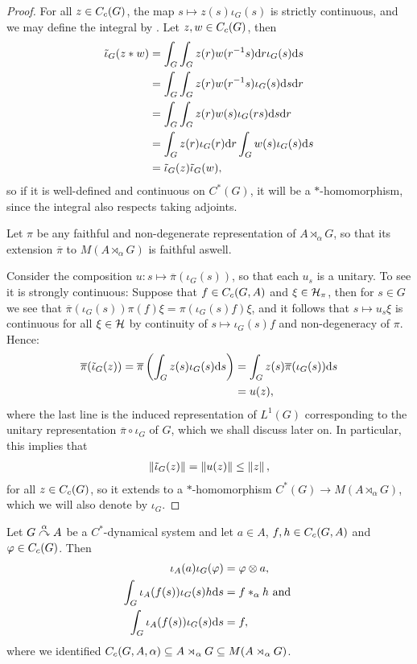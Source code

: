 \begin{proof}
For all $z \in C_c(G)$, the map $s \mapsto z(s) \iota_G(s)$ is strictly continuous, and we may define the integral by . Let $z,w \in C_c(G)$, then
\begin{align*}
	\tilde \iota_G(z \ast w) &= \int_G \int_G z(r)w(r^{-1}s) \mathrm{d} r \iota_G(s) \mathrm{d} s \\
	&= \int_G \int_G z(r) w(r^{-1}s) \iota_G(s) \mathrm{d} s \mathrm{d} r\\
	&= \int_G \int_G z(r) w(s) \iota_G(rs) \mathrm{d} s \mathrm{d} r\\
	&= \int_G z(r) \iota_G(r) \mathrm{d} r \int_G w(s) \iota_G(s) \mathrm{d} s \\
	&= \tilde \iota_G(z) \tilde \iota_G(w),
\end{align*}
so if it is well-defined and continuous on $C^*(G)$, it will be a $*$-homomorphism, since the integral also respects taking adjoints. 

Let $\pi$ be any faithful and non-degenerate representation of $A \rtimes_\alpha G$, so that its extension $\overline \pi $ to $M(A \rtimes_ \alpha G)$ is faithful aswell.

Consider the composition $u \colon s \mapsto \overline{\pi}( \iota_G(s))$, so that each $u_s$ is a unitary. To see it is strongly continuous: Suppose that $f \in C_c(G,A)$ and $\xi \in \mathcal{H}_\pi$, then for $s \in G$ we see that $\overline{ \pi} (\iota_G(s)) \pi(f) \xi = \pi(\iota_G(s) f) \xi$, and it follows that  $s \mapsto u_s \xi$ is continuous for all $\xi \in \mathcal{H}$ by continuity of $s \mapsto \iota_G(s)f$ and non-degeneracy of $\pi$. Hence:
\begin{align*}
\overline \pi(\tilde \iota_G(z)) = \overline \pi \left(  \int_G z(s) \iota_G(s) \mathrm{d} s \right) &=\int_G z(s) \overline \pi(\iota_G(s)) \mathrm{d} s \\
&= u(z),
\end{align*}
where the last line is the induced representation of $L^1(G)$ corresponding to the unitary representation $\overline \pi \circ \iota_G$ of $G$, which we shall discuss later on. In particular, this implies that
\begin{align}
	\left\lVert \tilde \iota_G(z)\right\rVert = \left\lVert u(z)\right\rVert \leq \left\lVert z \right\rVert,
\end{align}
for all $z \in C_c(G)$, so it extends to a $*$-homomorphism $C^*(G) \to M(A \rtimes_\alpha G)$, which we will also denote by $\iota_G$.
\end{proof}
\begin{corollary}
Let $G \stackrel{\alpha}{\curvearrowright} A$ be a $C^*$-dynamical system and let $a \in A$, $f,h \in C_c(G,A)$ and $\varphi \in C_c(G)$. Then
\begin{align*}
\iota_A(a) \iota_G(\varphi) &= \varphi \otimes a,\\
\int_G \iota_A(f(s)) \iota_G(s)h  \mathrm{d} s &= f \ast_\alpha h \text{ and }\\
\int_G \iota_A(f(s)) \iota_G(s) \mathrm{d} s & = f,
\end{align*}
where we identified $C_c(G,A,\alpha) \subseteq A \rtimes_\alpha G \subseteq M(A \rtimes_\alpha G)$.
\label{cross:iotaresults}
\end{corollary}
